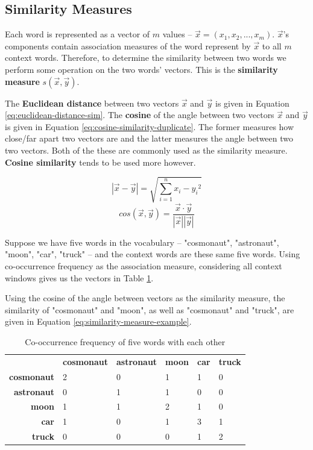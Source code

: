 \documentclass{article}
\begin{document}
\subsection{Similarity Measures}
\label{sec:similarity-measures}

Each word is represented as a vector of $m$ values -- $\vec{x} = (x_1, x_2, ..., x_m)$. $\vec{x}$'s components contain association measures of the word represent by $\vec{x}$ to all $m$ context words. Therefore, to determine the similarity between two words we perform some operation on the two words' vectors. This is the \textbf{similarity measure} $s(\vec{x}, \vec{y})$.

The \textbf{Euclidean distance} between two vectors $\vec{x}$ and $\vec{y}$ is given in Equation \ref{eq:euclidean-distance-sim}. The \textbf{cosine} of the angle between two vectors $\vec{x}$ and $\vec{y}$ is given in Equation \ref{eq:cosine-similarity-duplicate}. The former measures how close/far apart two vectors are and the latter measures the angle between two two vectors. Both of the these are commonly used as the similarity measure. \textbf{Cosine similarity} tends to be used more however.

\begin{equation}
	|\vec{x} - \vec{y}| = \sqrt{ \sum_{i=1}^n {x_i - y_i}^2 }
	\label{eq:euclidean-distance-sim}
\end{equation}
\begin{equation}
	cos(\vec{x}, \vec{y}) = \frac{\vec{x} \cdot \vec{y}}{|\vec{x}| |\vec{y}|}
	\label{eq:cosine-similarity-duplicate}
\end{equation}

Suppose we have five words in the vocabulary -- "cosmonaut", "astronaut", "moon", "car", "truck" -- and the context words are these same five words. Using co-occurrence frequency as the association measure, considering all context windows gives us the vectors in Table \ref{tab:similarity-measure-example}.

Using the cosine of the angle between vectors as the similarity measure, the similarity of "cosmonaut" and "moon", as well as "cosmonaut" and "truck", are given in Equation \ref{eq:similarity-measure-example}.

\begin{table}
	\centering
	\begin{tabular}{|r|l|l|l|l|l|}
		& \textbf{cosmonaut} & \textbf{astronaut} & \textbf{moon} & \textbf{car} & \textbf{truck} \\
		\textbf{cosmonaut} & 2 & 0 & 1 & 1 & 0 \\
		\textbf{astronaut} & 0 & 1 & 1 & 0 & 0 \\
		\textbf{moon} & 1 & 1 & 2 & 1 & 0 \\
		\textbf{car} & 1 & 0 & 1 & 3 & 1 \\
		\textbf{truck} & 0 & 0 & 0 & 1 & 2 \\								
	\end{tabular}
	\caption{Co-occurrence frequency of five words with each other}
	\label{tab:similarity-measure-example}
\end{table}
\end{document}
